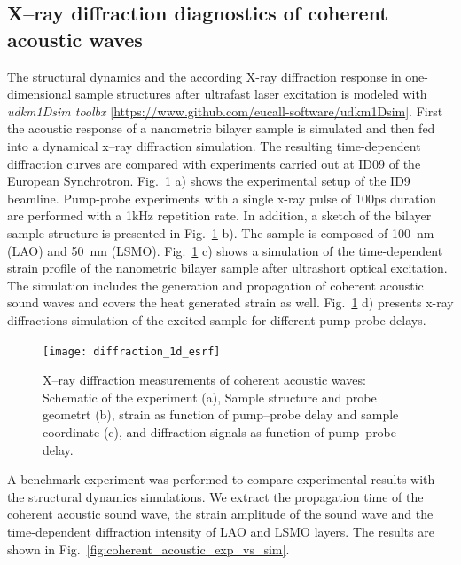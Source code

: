 \documentclass[10pt]{scrartcl}
\begin{document}
\subsection{X--ray diffraction diagnostics of coherent acoustic waves\label{sec:coherent_acoustic_phonons}}
The structural dynamics and the according X-ray diffraction response in
one-dimensional sample structures after ultrafast laser excitation is modeled
with \textit{udkm1Dsim toolbx} \cite{Schick2014}
[\url{https://www.github.com/eucall-software/udkm1Dsim}]. First the acoustic response of a
nanometric bilayer sample is simulated and then fed into a dynamical x--ray
diffraction simulation. The resulting time-dependent diffraction curves are
compared with experiments carried out at ID09 of the European Synchrotron.
Fig.~\ref{fig:Id9_exp_conditions} a) shows the experimental setup of the ID9
beamline. Pump-probe experiments with a single x-ray pulse of 100ps duration
are performed with a 1kHz repetition rate. In addition, a sketch of the bilayer
sample structure is presented in Fig.~\ref{fig:Id9_exp_conditions} b). The
sample is composed of \SI{100}{\nano\meter}  (LAO) and
\SI{50}{\nano\meter}  (LSMO).
Fig.~\ref{fig:Id9_exp_conditions} c) shows a simulation of the time-dependent
strain profile of the nanometric bilayer sample after ultrashort optical
excitation. The simulation includes the generation and propagation of coherent
acoustic sound waves and covers the heat generated strain  as well.
Fig.~\ref{fig:Id9_exp_conditions} d) presents x-ray diffractions simulation of
the excited sample for different pump-probe delays.

\begin{figure}[ht]
    \begin{center}
      \texttt{[image: diffraction\_1d\_esrf]}
    \end{center}
    \caption{X--ray diffraction measurements of coherent acoustic waves:
    Schematic of the experiment (a), Sample structure and probe geometrt (b),
  strain as function of pump--probe delay and sample coordinate (c), and
diffraction signals as function of pump--probe delay.}
    \label{fig:Id9_exp_conditions}
\end{figure}

A benchmark experiment was performed to compare experimental results with the structural dynamics simulations. We extract the propagation time of the coherent acoustic sound wave, the strain amplitude of the sound wave and the time-dependent diffraction intensity of LAO and LSMO  layers.
The results are shown in Fig.~\ref{fig:coherent_acoustic_exp_vs_sim}.
\end{document}
